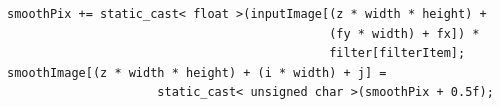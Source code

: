 \documentclass[a4paper]{article}
\begin{document}
\begin{lstlisting}[label=div2, caption=Unaligned accesses]
smoothPix += static_cast< float >(inputImage[(z * width * height) + 
                                             (fy * width) + fx]) * 
                                             filter[filterItem];
smoothImage[(z * width * height) + (i * width) + j] = 
                     static_cast< unsigned char >(smoothPix + 0.5f);
\end{lstlisting}
\FloatBarrier

\nocite{*}
\printbibliography
\end{document}
